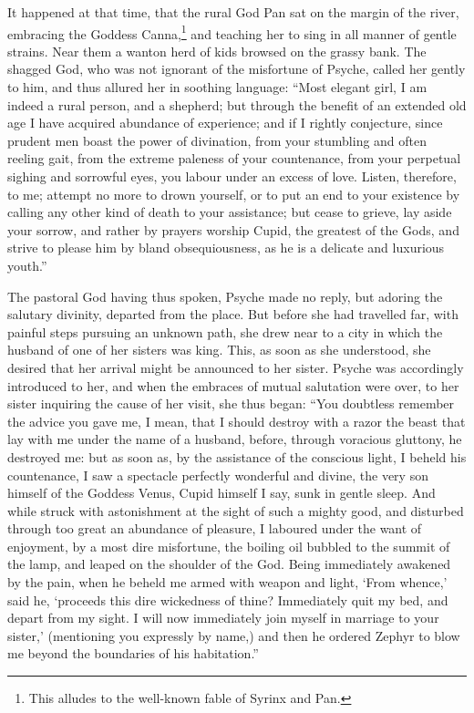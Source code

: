 \documentclass[12pt]{article}
\begin{document}
It happened at that time, that the rural God Pan sat on the margin of the
river, embracing the Goddess Canna,\footnote{This alludes to the well-known
fable of Syrinx and Pan.} and teaching her to sing in all manner of gentle
strains. Near them a wanton herd of kids browsed on the grassy bank. The
shagged God, who was not ignorant of the misfortune of Psyche, called her
gently to him, and thus allured her in soothing language: ``Most elegant girl,
I am indeed a rural person, and a shepherd; but through the benefit of an
extended old age I have acquired abundance of experience; and if I rightly
conjecture, since prudent men boast the power of divination, from your
stumbling and often reeling gait, from the extreme paleness of your
countenance, from your perpetual sighing and sorrowful eyes, you labour under
an excess of love. Listen, therefore, to me; attempt no more to drown yourself,
or to put an end to your existence by calling any other kind of death to your
assistance; but cease to grieve, lay aside your sorrow, and rather by prayers
worship Cupid, the greatest of the Gods, and strive to please him by bland
obsequiousness, as he is a delicate and luxurious youth.''

The pastoral God having thus spoken, Psyche made no reply, but adoring the
salutary divinity, departed from the place. But before she had travelled far,
with painful steps pursuing an unknown path, she drew near to a city in which
the husband of one of her sisters was king. This, as soon as she understood,
she desired that her arrival might be announced to her sister. Psyche was
accordingly introduced to her, and when the embraces of mutual salutation were
over, to her sister inquiring the cause of her visit, she thus began: ``You
doubtless remember the advice you gave me, I mean, that I should destroy with a
razor the beast that lay with me under the name of a husband, before, through
voracious gluttony, he destroyed me: but as soon as, by the assistance of the
conscious light, I beheld his countenance, I saw a spectacle perfectly
wonderful and divine, the very son himself of the Goddess Venus, Cupid himself
I say, sunk in gentle sleep. And while struck with astonishment at the sight of
such a mighty good, and disturbed through too great an abundance of pleasure, I
laboured under the want of enjoyment, by a most dire misfortune, the boiling
oil bubbled to the summit of the lamp, and leaped on the shoulder of the God.
Being immediately awakened by the pain, when he beheld me armed with weapon and
light, `From whence,' said he, `proceeds this dire wickedness of thine?
Immediately quit my bed, and depart from my sight. I will now immediately join
myself in marriage to your sister,' (mentioning you expressly by name,) and
then he ordered Zephyr to blow me beyond the boundaries of his habitation.''
\end{document}
